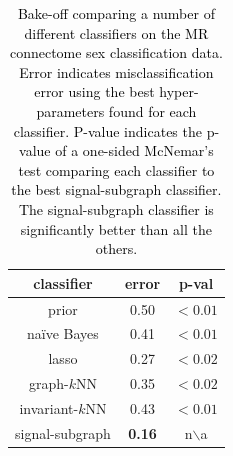 \documentclass[10pt,journal,cspaper,compsoc]{IEEEtran}
\providecommand{\tk}[1]{\textcolor{black}{#1}}
\begin{document}
\begin{table}
	\caption{\tk{Bake-off comparing a number of different classifiers on the MR connectome sex classification data.  Error indicates misclassification error using the best hyper-parameters found for each classifier. P-value indicates the p-value of a one-sided McNemar's test comparing each classifier to the best signal-subgraph classifier.  The signal-subgraph classifier is significantly better than all the others.}  }
	\begin{center}
\begin{tabular}{|c|c|c|}
	\hline
classifier & error & p-val \\
\hline \hline
prior 			& 0.50 & $<0.01$ \\ \hline
na\"ive Bayes 	& 0.41 & $<0.01$ 		\\ \hline
lasso 			& 0.27 & $<0.02$ 				  	\\ \hline
graph-$k$NN 	& 0.35 & $<0.02$ 	\\ \hline
invariant-$k$NN & 0.43 & $<0.01$		\\ \hline
signal-subgraph 		& \textbf{0.16} & n$\backslash$a \\ \hline
\end{tabular}
\end{center}
\label{tab:bakeoff}
\end{table}
\end{document}

